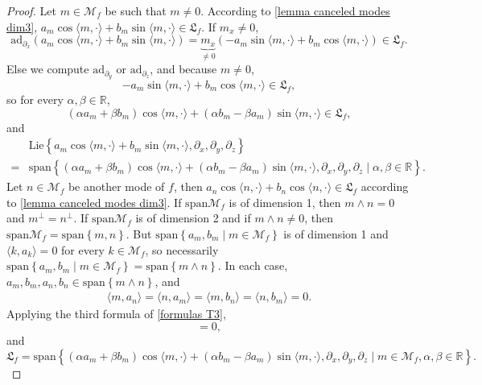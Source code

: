 \documentclass[10pt]{article}
\newcommand{\p}{\partial}
\newcommand{\R}{{\mathbb R}}
\newcommand{\M}{{\mathcal M}}
\newcommand{\la}{\langle}
\newcommand{\ra}{\rangle}
\newcommand{\ad}{\text{ad}}
\newcommand{\we}{\wedge}
\begin{document}
\begin{proof} Let $m\in \M_f$ be such that $m\neq 0$. According to \cref{lemma canceled modes dim3}, $a_m\cos \la m,\cdot \ra+b_m\sin\la m,\cdot \ra \in \mathfrak{L}_f$. If $m_x \neq 0$, 
    \begin{equation*}
        \ad_{\p_x}(a_m\cos \la m,\cdot \ra+b_m\sin\la m,\cdot \ra)=\underbrace{m_x}_{\neq0}(-a_m\sin\la m,\cdot \ra+b_m\cos \la m,\cdot \ra) \in \mathfrak{L}_f.
    \end{equation*}
    Else we compute $\ad_{\p_y}$ or $\ad_{\p_z}$, and because $m\neq0$, 
    \begin{equation*}
        -a_m\sin\la m,\cdot \ra+b_m\cos \la m,\cdot \ra \in \mathfrak{L}_f,
    \end{equation*}
    so for every $\alpha,\beta \in \R$,
    \begin{equation*}
        (\alpha a_m+\beta b_m)\cos \la m,\cdot \ra+(\alpha b_m - \beta a_m)\sin \la m,\cdot \ra \in \mathfrak{L}_f,
    \end{equation*}
    and 
    \begin{align*}
        &\mathrm{Lie} \left\{a_m\cos \la m,\cdot \ra+b_m\sin \la m,\cdot \ra,\p_x,\p_y,\p_z\right\} \\
        =&\mathrm{span} \left\{(\alpha a_m+\beta b_m)\cos \la m,\cdot \ra+(\alpha b_m -\beta a_m)\sin \la m,\cdot \ra,\p_x,\p_y,\p_z \mid \alpha,\beta \in \R \right\}.
    \end{align*}
    Let $n\in \M_f$ be another mode of $f$, then $a_n\cos \la n,\cdot \ra + b_n \cos \la n,\cdot \ra \in \mathfrak{L}_f$ according to \cref{lemma canceled modes dim3}. If $\mathrm{span}\M_f$ is of dimension 1, then $m\we n=0$ and $m^{\perp}=n^{\perp}$. If $\mathrm{span}\M_f$ is of dimension 2 and if $m\we n\neq0$, then $\mathrm{span}\M_f=\mathrm{span} \left\{m,n\right\}$. But $\mathrm{span}\left\{a_m,b_m \mid m\in \M_f\right\}$ is of dimension 1 and $\la k,a_k\ra=0$ for every $k\in \M_f$, so necessarily $\mathrm{span}\left\{a_m,b_m\mid m \in \M_f\right\}=\mathrm{span} \left\{m\we n\right\}$. In each case, $a_m,b_m,a_n,b_n \in \mathrm{span} \left\{m\we n\right\}$, and
    \begin{align*}
        \la m,a_n\ra=\la n,a_m\ra=\la m,b_n\ra=\la n,b_m\ra=0.
    \end{align*}
    Applying the third formula of \cref{formulas T3},
    \begin{equation*}
        [a_m\cos\la m,\cdot \ra +b_m\sin \la m,\cdot \ra,a_n\cos\la n,\cdot\ra +b_n \sin \la n,\cdot \ra]=0,
    \end{equation*}
    and 
    \begin{equation*}
        \mathfrak{L}_f=\mathrm{span} \left\{(\alpha a_m+\beta b_m)\cos \la m,\cdot \ra+(\alpha b_m-\beta a_m)\sin \la m,\cdot \ra,\p_x,\p_y,\p_z \mid m\in \M_f, \alpha,\beta \in \R\right\}. 
    \end{equation*}
\end{proof}
\end{document}
